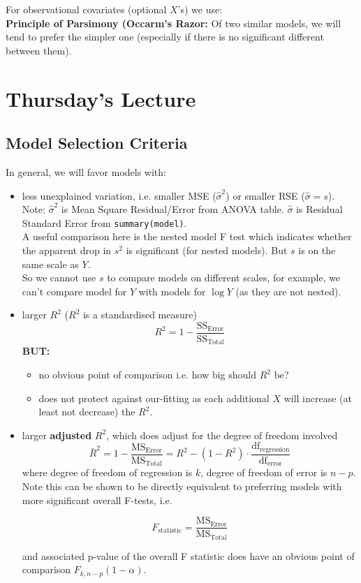 \documentclass[a4paper, 11pt, twoside]{article}
\begin{document}
For observational covariates (optional $X$'s) we use:\\

\textbf{Principle of Parsimony (Occarm's Razor:} Of two similar models, we will tend to prefer the simpler one (especially if there is no significant different between them).

\section{Thursday's Lecture}
\subsection{Model Selection Criteria}

In general, we will favor models with:

\begin{itemize}
	\item less unexplained variation, i.e. smaller MSE ($\hat{\sigma}^2$) or smaller RSE ($\hat{\sigma}=s$).\\
	Note: $\hat{\sigma}^2$ is Mean Square Residual/Error from ANOVA table. $\hat{\sigma}$ is Residual Standard Error from \texttt{summary(model)}.\\
	A useful comparison here is the nested model F test which indicates whether the apparent drop in $s^2$ is significant (for nested models). But $s$ is on the same scale as $Y$.\\
	So we cannot use $s$ to compare models on different scales, for example, we can't compare model for $Y$ with models for $\log{Y}$ (as they are not nested).
	\item larger $R^2$ ($R^2$ is a standardised measure)
	\[R^2=1-\frac{\text{SS}_{\text{Error}}}{\text{SS}_{\text{Total}}}\]
	\textbf{BUT:} \begin{itemize}
		\item no obvious point of comparison i.e. how big should $R^2$ be?
		\item does not protect against our-fitting as each additional $X$ will increase (at least not decrease) the $R^2$.
	\end{itemize}
	\item larger \textbf{adjusted} $R^2$, which does adjust for the degree of freedom involved
	\[\bar{R}^2=1-\frac{\text{MS}_{\text{Error}}}{\text{MS}_{\text{Total}}}= R^2 - (1-R^2)\cdot \frac{\text{df}_{\text{regression}}}{\text{df}_{\text{error}}}\]
	where degree of freedom of regression is $k$, degree of freedom of error is $n-p$.\\
	Note this can be shown to be directly equivalent to preferring models with more significant overall F-tests, i.e.
	
	\[F_{\text{statistic}} = \frac{\text{MS}_{\text{Error}}}{\text{MS}_{\text{Total}}}\]
	
	and associated p-value of the overall F statistic does have an obvious point of comparison $F_{k,n-p}(1-\alpha)$.
\end{itemize}
\end{document}
